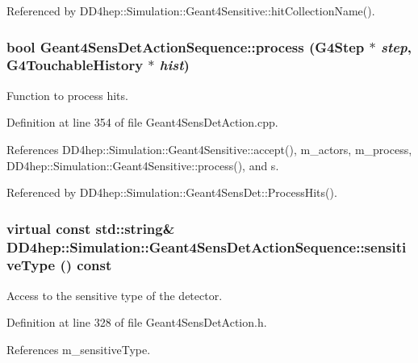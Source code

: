 Referenced by DD4hep::Simulation::Geant4Sensitive::hitCollectionName().\hypertarget{class_d_d4hep_1_1_simulation_1_1_geant4_sens_det_action_sequence_a452bc5bf7c03c8b546d3459ba7bf7e36}{
\subsubsection[{process}]{\setlength{\rightskip}{0pt plus 5cm}bool Geant4SensDetActionSequence::process (G4Step $\ast$ {\em step}, \/  G4TouchableHistory $\ast$ {\em hist})}}
\label{class_d_d4hep_1_1_simulation_1_1_geant4_sens_det_action_sequence_a452bc5bf7c03c8b546d3459ba7bf7e36}


Function to process hits. 

Definition at line 354 of file Geant4SensDetAction.cpp.

References DD4hep::Simulation::Geant4Sensitive::accept(), m\_\-actors, m\_\-process, DD4hep::Simulation::Geant4Sensitive::process(), and s.

Referenced by DD4hep::Simulation::Geant4SensDet::ProcessHits().\hypertarget{class_d_d4hep_1_1_simulation_1_1_geant4_sens_det_action_sequence_a6532bc350702a2c13bd15e6450e525c5}{
\subsubsection[{sensitiveType}]{\setlength{\rightskip}{0pt plus 5cm}virtual const std::string\& DD4hep::Simulation::Geant4SensDetActionSequence::sensitiveType () const}}
\label{class_d_d4hep_1_1_simulation_1_1_geant4_sens_det_action_sequence_a6532bc350702a2c13bd15e6450e525c5}


Access to the sensitive type of the detector. 

Definition at line 328 of file Geant4SensDetAction.h.

References m\_\-sensitiveType.

